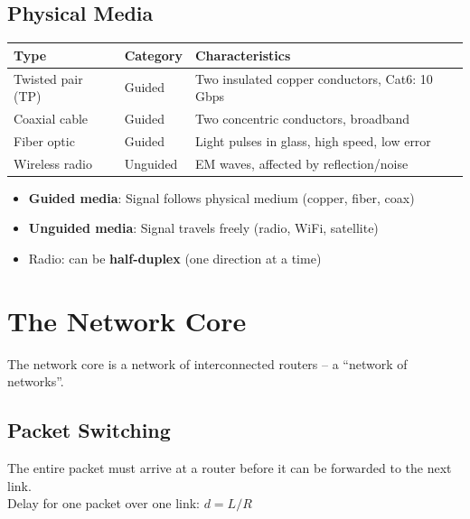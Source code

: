 \subsection{Physical Media}

\begin{center}
\begin{tabular}{lll}
\toprule
\textbf{Type} & \textbf{Category} & \textbf{Characteristics} \\
\midrule
Twisted pair (TP) & Guided & Two insulated copper conductors, Cat6: 10 Gbps \\
Coaxial cable & Guided & Two concentric conductors, broadband \\
Fiber optic & Guided & Light pulses in glass, high speed, low error \\
Wireless radio & Unguided & EM waves, affected by reflection/noise \\
\bottomrule
\end{tabular}
\end{center}

\begin{itemize}[noitemsep]
    \item \textbf{Guided media}: Signal follows physical medium (copper, fiber, coax)
    \item \textbf{Unguided media}: Signal travels freely (radio, WiFi, satellite)
    \item Radio: can be \textbf{half-duplex} (one direction at a time)
\end{itemize}

\section{The Network Core}

The network core is a network of interconnected routers -- a ``network of networks''.

\subsection{Packet Switching}

\begin{keybox}
The entire packet must arrive at a router before it can be forwarded to the next link.\\
Delay for one packet over one link: $d = L/R$
\end{keybox}

